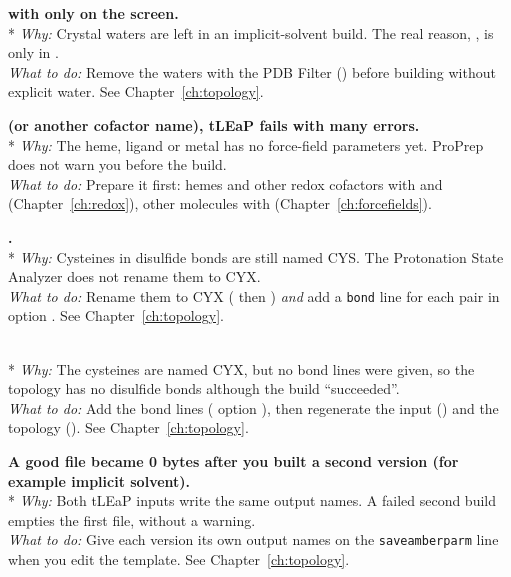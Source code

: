 {\bfseries {} with only  on the screen.}\\*
\emph{Why:} Crystal waters are left in an implicit-solvent build. The real
reason, , is only in .\\
\emph{What to do:} Remove the waters with the PDB Filter () before
building without explicit water. See Chapter~\ref{ch:topology}.

{\bfseries {} (or another cofactor name), tLEaP
fails with many errors.}\\*
\emph{Why:} The heme, ligand or metal has no force-field parameters yet.
ProPrep does not warn you before the build.\\
\emph{What to do:} Prepare it first: hemes and other redox cofactors with
 and  (Chapter~\ref{ch:redox}), other molecules with 
(Chapter~\ref{ch:forcefields}).

{\bfseries {}.}\\*
\emph{Why:} Cysteines in disulfide bonds are still named CYS. The
Protonation State Analyzer does not rename them to CYX.\\
\emph{What to do:} Rename them to CYX ( then ) \emph{and} add
a \texttt{bond} line for each pair in  option . See
Chapter~\ref{ch:topology}.

{\bfseries {}}\\*
\emph{Why:} The cysteines are named CYX, but no bond lines were given, so the
topology has no disulfide bonds although the build ``succeeded''.\\
\emph{What to do:} Add the bond lines ( option ), then
regenerate the input () and the topology (). See
Chapter~\ref{ch:topology}.

{\bfseries A good  file became 0 bytes after you built a second
version (for example implicit solvent).}\\*
\emph{Why:} Both tLEaP inputs write the same output names. A failed second
build empties the first file, without a warning.\\
\emph{What to do:} Give each version its own output names on the
\texttt{saveamberparm} line when you edit the template. See
Chapter~\ref{ch:topology}.

